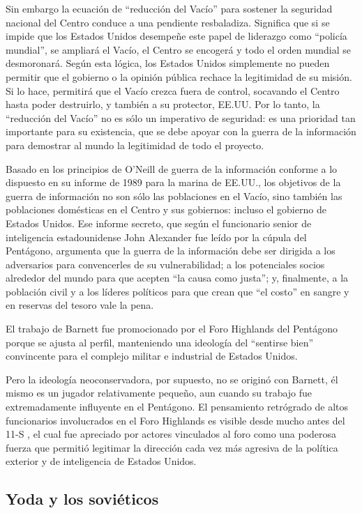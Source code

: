 \documentclass[10pt,a5paper,twoside,spanish,]{book}
\begin{document}
Sin embargo la ecuación de ``reducción del Vacío'' para sostener la
seguridad nacional del Centro conduce a una pendiente resbaladiza.
Significa que si se impide que los Estados Unidos desempeñe este papel
de liderazgo como ``policía mundial'', se ampliará el Vacío, el Centro
se encogerá y todo el orden mundial se desmoronará. Según esta lógica,
los Estados Unidos simplemente no pueden permitir que el gobierno o la
opinión pública rechace la legitimidad de su misión. Si lo hace,
permitirá que el Vacío crezca fuera de control, socavando el Centro
hasta poder destruirlo, y también a su protector, EE.UU. Por lo tanto,
la ``reducción del Vacío'' no es sólo un imperativo de seguridad: es una
prioridad tan importante para su existencia, que se debe apoyar con la
guerra de la información para demostrar al mundo la legitimidad de todo
el proyecto.

Basado en los principios de O'Neill de guerra de la información conforme
a lo dispuesto en su informe de 1989 para la marina de EE.UU., los
objetivos de la guerra de información no son sólo las poblaciones en el
Vacío, sino también las poblaciones domésticas en el Centro y sus
gobiernos: incluso el gobierno de Estados Unidos. Ese informe secreto,
que según el funcionario senior de inteligencia estadounidense John
Alexander fue leído por la cúpula del Pentágono, argumenta que la guerra
de la información debe ser dirigida a los adversarios para convencerles
de su vulnerabilidad; a los potenciales socios alrededor del mundo para
que acepten ``la causa como justa''; y, finalmente, a la población civil
y a los líderes políticos para que crean que ``el costo'' en sangre y en
reservas del tesoro vale la pena.

El trabajo de Barnett fue promocionado por el Foro Highlands del
Pentágono porque se ajusta al perfil, manteniendo una ideología del
``sentirse bien'' convincente para el complejo militar e industrial de
Estados Unidos.

Pero la ideología neoconservadora, por supuesto, no se originó con
Barnett, él mismo es un jugador relativamente pequeño, aun cuando su
trabajo fue extremadamente influyente en el Pentágono. El pensamiento
retrógrado de altos funcionarios involucrados en el Foro Highlands es
visible desde mucho antes del 11-S , el cual fue apreciado por actores
vinculados al foro como una poderosa fuerza que permitió legitimar la
dirección cada vez más agresiva de la política exterior y de
inteligencia de Estados Unidos.

\subsection{Yoda y los soviéticos}\label{yoda-y-los-soviuxe9ticos}
\end{document}
